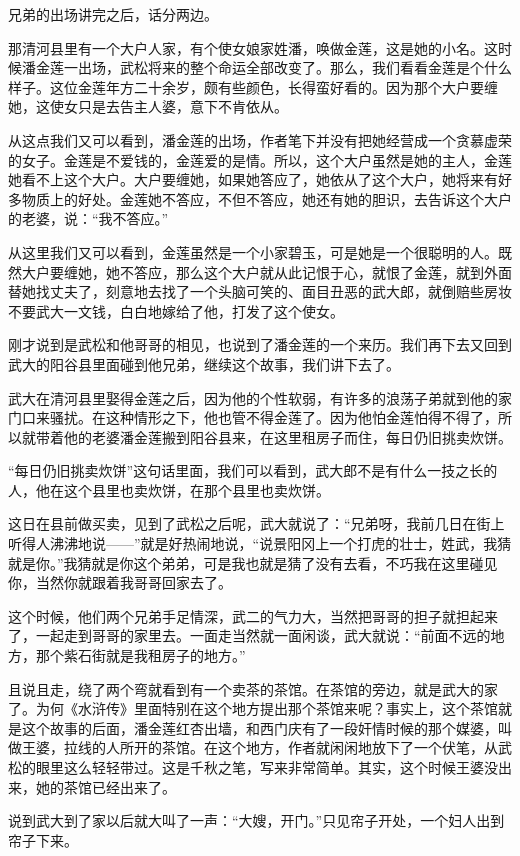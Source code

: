 \par 兄弟的出场讲完之后，话分两边。
\par 那清河县里有一个大户人家，有个使女娘家姓潘，唤做金莲，这是她的小名。这时候潘金莲一出场，武松将来的整个命运全部改变了。那么，我们看看金莲是个什么样子。这位金莲年方二十余岁，颇有些颜色，长得蛮好看的。因为那个大户要缠她，这使女只是去告主人婆，意下不肯依从。
\par 从这点我们又可以看到，潘金莲的出场，作者笔下并没有把她经营成一个贪慕虚荣的女子。金莲是不爱钱的，金莲爱的是情。所以，这个大户虽然是她的主人，金莲她看不上这个大户。大户要缠她，如果她答应了，她依从了这个大户，她将来有好多物质上的好处。金莲她不答应，不但不答应，她还有她的胆识，去告诉这个大户的老婆，说：“我不答应。”
\par 从这里我们又可以看到，金莲虽然是一个小家碧玉，可是她是一个很聪明的人。既然大户要缠她，她不答应，那么这个大户就从此记恨于心，就恨了金莲，就到外面替她找丈夫了，刻意地去找了一个头脑可笑的、面目丑恶的武大郎，就倒赔些房妆不要武大一文钱，白白地嫁给了他，打发了这个使女。
\par 刚才说到是武松和他哥哥的相见，也说到了潘金莲的一个来历。我们再下去又回到武大的阳谷县里面碰到他兄弟，继续这个故事，我们讲下去了。
\par 武大在清河县里娶得金莲之后，因为他的个性软弱，有许多的浪荡子弟就到他的家门口来骚扰。在这种情形之下，他也管不得金莲了。因为他怕金莲怕得不得了，所以就带着他的老婆潘金莲搬到阳谷县来，在这里租房子而住，每日仍旧挑卖炊饼。
\par “每日仍旧挑卖炊饼”这句话里面，我们可以看到，武大郎不是有什么一技之长的人，他在这个县里也卖炊饼，在那个县里也卖炊饼。
\par 这日在县前做买卖，见到了武松之后呢，武大就说了：“兄弟呀，我前几日在街上听得人沸沸地说——”就是好热闹地说，“说景阳冈上一个打虎的壮士，姓武，我猜就是你。”我猜就是你这个弟弟，可是我也就是猜了没有去看，不巧我在这里碰见你，当然你就跟着我哥哥回家去了。
\par 这个时候，他们两个兄弟手足情深，武二的气力大，当然把哥哥的担子就担起来了，一起走到哥哥的家里去。一面走当然就一面闲谈，武大就说：“前面不远的地方，那个紫石街就是我租房子的地方。”
\par 且说且走，绕了两个弯就看到有一个卖茶的茶馆。在茶馆的旁边，就是武大的家了。为何《水浒传》里面特别在这个地方提出那个茶馆来呢？事实上，这个茶馆就是这个故事的后面，潘金莲红杏出墙，和西门庆有了一段奸情时候的那个媒婆，叫做王婆，拉线的人所开的茶馆。在这个地方，作者就闲闲地放下了一个伏笔，从武松的眼里这么轻轻带过。这是千秋之笔，写来非常简单。其实，这个时候王婆没出来，她的茶馆已经出来了。
\par 说到武大到了家以后就大叫了一声：“大嫂，开门。”只见帘子开处，一个妇人出到帘子下来。
